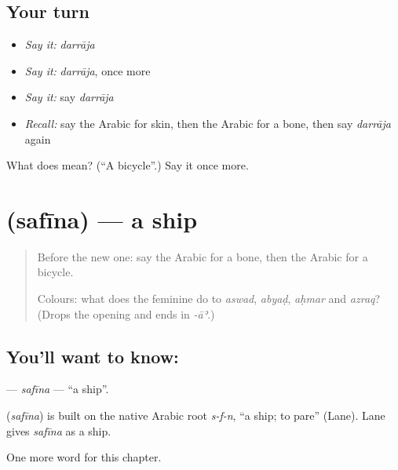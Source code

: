 \subsection*{Your turn}
\begin{itemize}
\raggedright
  \item \emph{Say it:} \emph{darrāja}
  \item \emph{Say it:} \emph{darrāja}, once more
  \item \emph{Say it:} say \emph{darrāja}
  \item \emph{Recall:} say the Arabic for skin, then the Arabic for a bone, then say \emph{darrāja} again
\end{itemize}

\begin{tcolorbox}[breakable,colback=teal!4,colframe=teal!35!black,title={Before you move on}]
What does  mean? (\textquotedblleft{}A bicycle\textquotedblright{}.) Say it once more.
\end{tcolorbox}
\section[\texorpdfstring{\ar{سفينة} (safīna)}{سفينة (safīna)}]{ (safīna) — a ship}

\label{lesson:AR-C142-safina}



\begin{quote}
Before the new one: say the Arabic for a bone, then the Arabic for a bicycle.

Colours: what does the feminine do to \emph{aswad}, \emph{abyaḍ}, \emph{aḥmar} and \emph{azraq}? (Drops the opening \textbf{} and ends in \emph{-āʾ}.)
\end{quote}

\subsection*{You'll want to know: }
\textbf{} — \emph{safīna} — \textquotedblleft{}a ship\textquotedblright{}.

\begin{cousinweb}
\textbf{} (\emph{safīna}) is built on the native Arabic root \emph{s-f-n}, \textquotedblleft{}a ship; to pare\textquotedblright{} (Lane). Lane gives \emph{safīna} as a ship.
\end{cousinweb}

\begin{grammarlens}[title={What you've built}]
One more word for this chapter.
\end{grammarlens}

